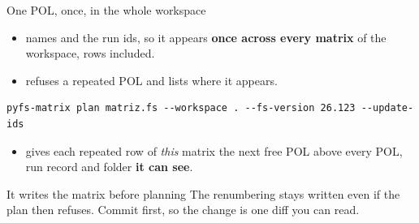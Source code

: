 \begin{frame}[fragile]{One POL, once, in the whole workspace}
\begin{itemize}
  \item {} names  and the run ids, so it appears
        \textbf{once across every matrix} of the workspace, 
        rows included.
  \item {} refuses a repeated POL and lists where it appears.
\end{itemize}
\begin{lstlisting}[style=ftsbase]
pyfs-matrix plan matriz.fs --workspace . --fs-version 26.123 --update-ids
\end{lstlisting}
\begin{itemize}
  \item {} gives each repeated row of \emph{this} matrix the
        next free POL above every POL, run record and  folder
        \textbf{it can see}.
\end{itemize}
\begin{alertblock}{It writes the matrix before planning}
The renumbering stays written even if the plan then refuses. Commit first, so
the change is one diff you can read.
\end{alertblock}
\end{frame}

